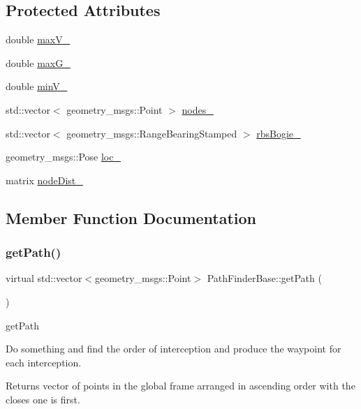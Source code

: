 \subsection*{Protected Attributes}
\begin{DoxyCompactItemize}
\item 
double \hyperlink{classPathFinderBase_a1161854780f0ca7860878bf3288a4d7d}{max\+V\+\_\+}
\item 
double \hyperlink{classPathFinderBase_ab091d8e0e0395d7ee4f4b139e62145d8}{max\+G\+\_\+}
\item 
double \hyperlink{classPathFinderBase_a4813a6420de8c46980fd97d35f75634c}{min\+V\+\_\+}
\item 
std\+::vector$<$ geometry\+\_\+msgs\+::\+Point $>$ \hyperlink{classPathFinderBase_aa93e42466b581a5455c82ac9da44dc70}{nodes\+\_\+}
\item 
std\+::vector$<$ geometry\+\_\+msgs\+::\+Range\+Bearing\+Stamped $>$ \hyperlink{classPathFinderBase_a21b832ada9734a1edc08c990f69ac9d9}{rbs\+Bogie\+\_\+}
\item 
geometry\+\_\+msgs\+::\+Pose \hyperlink{classPathFinderBase_a9d62a43efa54ce2bb88b43e3dd40ecdc}{loc\+\_\+}
\item 
matrix \hyperlink{classPathFinderBase_a6f609273f6727b1948cb72461fd78654}{node\+Dist\+\_\+}
\end{DoxyCompactItemize}


\subsection{Member Function Documentation}
\mbox{\label{classPathFinderBase_aa254c2b8392f028898f691920341caa0}} 
\subsubsection{\texorpdfstring{get\+Path()}{getPath()}}
{\footnotesize\ttfamily virtual std\+::vector$<$geometry\+\_\+msgs\+::\+Point$>$ Path\+Finder\+Base\+::get\+Path (\begin{DoxyParamCaption}{ }\end{DoxyParamCaption})\hspace{0.3cm}{\ttfamily [pure virtual]}}



get\+Path 

Do something and find the order of interception and produce the waypoint for each interception. \begin{DoxyReturn}{Returns}
vector of points in the global frame arranged in ascending order with the closes one is first. 
\end{DoxyReturn}


